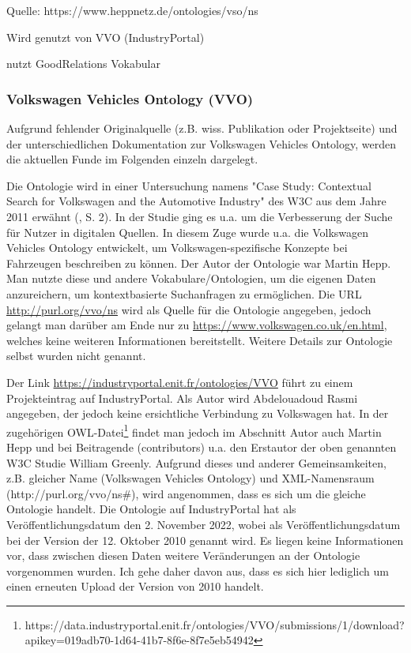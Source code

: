 \documentclass{article}
\begin{document}
Quelle: https://www.heppnetz.de/ontologies/vso/ns

Wird genutzt von VVO (IndustryPortal)

nutzt GoodRelations Vokabular

\subsubsection{Volkswagen Vehicles Ontology (VVO)}

Aufgrund fehlender Originalquelle (z.B. wiss. Publikation oder Projektseite) und der unterschiedlichen Dokumentation zur Volkswagen Vehicles Ontology, werden die aktuellen Funde im Folgenden einzeln dargelegt.

Die Ontologie wird in einer Untersuchung namens "Case Study: Contextual Search for Volkswagen and the Automotive Industry" des W3C aus dem Jahre 2011 erwähnt (\cite{greenly2011case}, S. 2).
In der Studie ging es u.a. um die Verbesserung der Suche für Nutzer in digitalen Quellen.
In diesem Zuge wurde u.a. die Volkswagen Vehicles Ontology entwickelt, um Volkswagen-spezifische Konzepte bei Fahrzeugen beschreiben zu können.
Der Autor der Ontologie war Martin Hepp.
Man nutzte diese und andere Vokabulare/Ontologien, um die eigenen Daten anzureichern, um kontextbasierte Suchanfragen zu ermöglichen.
Die URL \url{http://purl.org/vvo/ns} wird als Quelle für die Ontologie angegeben, jedoch gelangt man darüber am Ende nur zu \url{https://www.volkswagen.co.uk/en.html}, welches keine weiteren Informationen bereitstellt.
Weitere Details zur Ontologie selbst wurden nicht genannt.

Der Link \url{https://industryportal.enit.fr/ontologies/VVO} führt zu einem Projekteintrag auf IndustryPortal.
Als Autor wird Abdelouadoud Rasmi angegeben, der jedoch keine ersichtliche Verbindung zu Volkswagen hat.
In der zugehörigen OWL-Datei\footnote{https://data.industryportal.enit.fr/ontologies/VVO/submissions/1/download?apikey=019adb70-1d64-41b7-8f6e-8f7e5eb54942} findet man jedoch im Abschnitt Autor auch Martin Hepp und bei Beitragende (contributors) u.a. den Erstautor der oben genannten W3C Studie William Greenly.
Aufgrund dieses und anderer Gemeinsamkeiten, z.B. gleicher Name (Volkswagen Vehicles Ontology) und XML-Namensraum (http://purl.org/vvo/ns\#), wird angenommen, dass es sich um die gleiche Ontologie handelt. Die Ontologie auf IndustryPortal hat als Veröffentlichungsdatum den 2. November 2022, wobei als Veröffentlichungsdatum bei der Version der 12. Oktober 2010 genannt wird.
Es liegen keine Informationen vor, dass zwischen diesen Daten weitere Veränderungen an der Ontologie vorgenommen wurden.
Ich gehe daher davon aus, dass es sich hier lediglich um einen erneuten Upload der Version von 2010 handelt.
\end{document}
